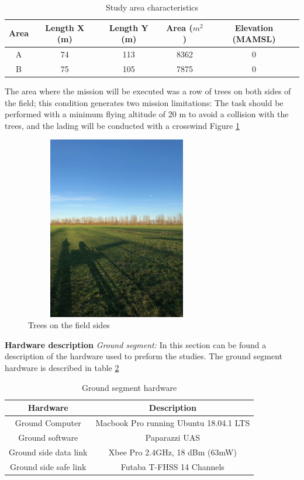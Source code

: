 \begin{table}[H]
\centering
\begin{tabular}{|c|c|c|c|c|}
\hline
Area & Length X (m) & Length Y (m) & Area ($m^2$) & Elevation (MAMSL) \\ \hline
A     & 74           & 113         &  8362     & 0                 \\ \hline
B     & 75           & 105          & 7875      & 0                 \\ \hline
\end{tabular}
\caption{Study area characteristics}
\label{table: Area_char}
\end{table}
The area where the mission will be executed was a row of trees on both sides of the field; this condition generates two mission limitations: The task should be performed with a minimum flying altitude of 20 m to avoid a collision with the trees, and the lading will be conducted with a crosswind Figure \ref{fig:ARboles}
\begin{figure}[H]
\centering
\includegraphics[width=8cm,height=8cm,keepaspectratio,angle=-90]{imagenes/IMG_1122.JPG}
\caption{Trees on the field sides}
\label{fig:ARboles}
\end{figure}
\textbf{Hardware description}\newline
\textit{Ground segment:}
In this section can be found a description of the hardware used to preform the studies.
The ground segment hardware is described in table \ref{Table:Ground_Hardware}
\begin{table}[H]
\centering
\begin{tabular}{|c|c|}
\hline
Hardware             & Description                            \\ \hline
Ground Computer      & Macbook Pro running Ubuntu 18.04.1 LTS \\ \hline
Ground software      & Paparazzi UAS                          \\ \hline
Ground side data link & Xbee Pro 2.4GHz, 18 dBm (63mW)         \\ \hline
Ground side safe link  & Futaba T-FHSS 14 Channels               \\ \hline
\end{tabular}
\caption{Ground segment hardware}
\label{Table:Ground_Hardware}
\end{table}


